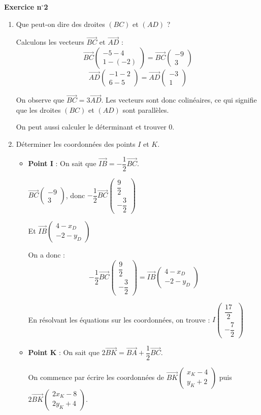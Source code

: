\documentclass{article}
\newcommand*{\Coord}[2]{%
  \ensuremath{
    \begin{pmatrix}
      #1 \\[10pt]
      #2
    \end{pmatrix}}
}
\begin{document}
\vspace{20pt}


\textbf{Exercice n$^\circ$2}

\begin{enumerate}

    \item Que peut-on dire des droites $(BC)$ et $(AD)$ ?

    Calculons les vecteurs $\overrightarrow{BC}$ et $\overrightarrow{AD}$ :
    \[
    \overrightarrow{BC} \Coord{-5 - 4}{1 - (-2)} = \overrightarrow{BC} \Coord{-9}{3}
    \]
    \[
    \overrightarrow{AD} \Coord{-1-2}{6-5} = \overrightarrow{AD} \Coord{-3}{1}
    \]

    On observe que $\overrightarrow{BC} = 3\overrightarrow{AD}$. Les vecteurs sont donc colinéaires, 
    ce qui signifie que les droites $(BC)$ et $(AD)$ sont parallèles.

    \vspace{5pt}
    On peut aussi calculer le déterminant et trouver 0.

    \item Déterminer les coordonnées des points $I$ et $K$.

    \begin{itemize}
        \item \textbf{Point I} :
        On sait que $\overrightarrow{IB} = -\dfrac{1}{2}\overrightarrow{BC}$.
        
        $\overrightarrow{BC}\Coord{-9}{3}$, donc $-\dfrac{1}{2}\overrightarrow{BC}
        \Coord{\dfrac{9}{2}}{-\dfrac{3}{2}}$

        Et $\overrightarrow{IB}\Coord{4-x_D}{-2-y_D}$

        On a donc :
        \[
        -\dfrac{1}{2}\overrightarrow{BC}
        \Coord{\dfrac{9}{2}}{-\dfrac{3}{2}} = \overrightarrow{IB}\Coord{4-x_D}{-2-y_D}
        \]
        
        En résolvant les équations sur les coordonnées, on trouve : $I\Coord{\dfrac{17}{2}}{-\dfrac{7}{2}}$

        \item \textbf{Point K} :
        On sait que $2\overrightarrow{BK} = \overrightarrow{BA} + \dfrac{1}{2}\overrightarrow{BC}$.
        
        On commence par écrire les coordonnées de $\overrightarrow{BK}\Coord{x_K-4}{y_K+2}$ 
        puis $2 \overrightarrow{BK}\Coord{2x_K-8}{2y_K + 4}$.
        

\end{itemize}
\end{enumerate}
\end{document}
